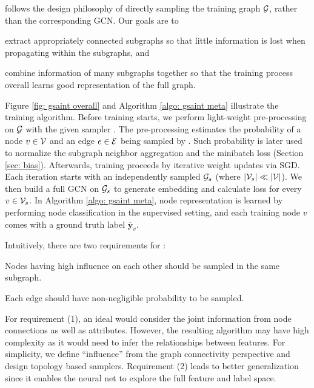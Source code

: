 {\graphsaint} follows the design philosophy of directly sampling the training graph $\G$, rather than the corresponding GCN. 
Our goals are to 
\begin{enumerate*}
    \item extract appropriately connected subgraphs so that little information is lost when propagating within the subgraphs, and
    \item combine information of many subgraphs together so that the training process overall learns good representation of the full graph.
\end{enumerate*}


Figure \ref{fig: gsaint overall} and Algorithm \ref{algo: gsaint meta} illustrate the training algorithm. 
Before training starts, we perform light-weight pre-processing on $\G$ with the given sampler \sample. The pre-processing estimates the probability of a node $v\in\V$ and an edge $e\in\E$ being sampled by {\sample}. Such probability is later used to normalize  the subgraph neighbor aggregation and the minibatch loss (Section \ref{sec: bias}). Afterwards, training proceeds by iterative weight updates via SGD. 
Each iteration starts with an independently sampled $\G[s]$ (where $\size{\V[s]}\ll \size{\V}$). We then build a full GCN on $\G[s]$ to generate embedding and calculate loss for every $v\in \V[s]$. 
In Algorithm \ref{algo: gsaint meta}, node representation is learned by performing node classification in the supervised setting, and each training node $v$ comes with a ground truth label $\overline{\bm{y}}_v$. 

Intuitively, there are two requirements for {\sample}: 
\begin{enumerate*}
    \item Nodes having high influence on each other should be sampled in the same subgraph.
    \item Each edge should have non-negligible probability to be sampled. 
\end{enumerate*}
For requirement (1), an ideal {\sample} would consider the joint information from node connections as well as attributes. However, the resulting algorithm may have high complexity as it would need to infer the relationships between features. For simplicity, we define ``influence'' from the graph connectivity perspective and design topology based samplers. 
Requirement (2) leads to better generalization since it enables the neural net to explore the full feature and label space. %


